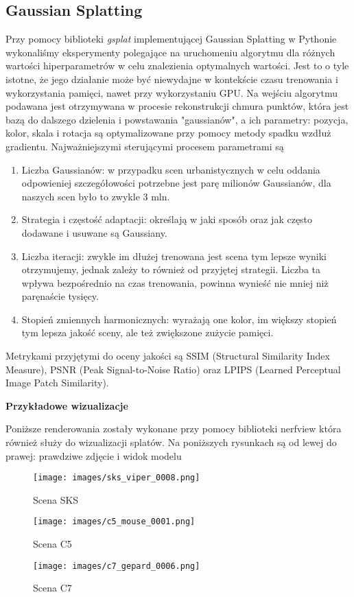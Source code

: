 \subsection{Gaussian Splatting}
Przy pomocy biblioteki \textit{gsplat}\cite{ye2024gsplatopensourcelibrarygaussian} implementującej Gaussian Splatting w Pythonie wykonaliśmy eksperymenty polegające na uruchomeniu algorytmu dla różnych wartości hiperparametrów w celu znalezienia optymalnych wartości. Jest to o tyle istotne, że jego działanie może być niewydajne w kontekście czasu trenowania i wykorzystania pamięci, nawet przy wykorzystaniu GPU. 
Na wejściu algorytmu podawana jest otrzymywana w procesie rekonstrukcji chmura punktów, która jest bazą do dalszego dzielenia i powstawania "gaussianów", a ich parametry: pozycja, kolor, skala i rotacja są optymalizowane przy pomocy metody spadku wzdłuż gradientu.
Najważniejszymi sterującymi procesem parametrami są 
\begin{enumerate}
    \item Liczba Gaussianów: w przypadku scen urbanistycznych w celu oddania odpowieniej szczegółowości potrzebne jest parę milionów Gaussianów, dla naszych scen było to zwykle 3 mln.
    \item Strategia i częstość adaptacji: określają w jaki sposób oraz jak często dodawane i usuwane są Gaussiany.
    \item Liczba iteracji: zwykle im dłużej trenowana jest scena tym lepsze wyniki otrzymujemy, jednak zależy to również od przyjętej strategii. Liczba ta wpływa bezpośrednio na czas trenowania, powinna wynieść nie mniej niż paręnaście tysięcy.
    \item Stopień zmiennych harmonicznych: wyrażają one kolor, im większy stopień tym lepsza jakość sceny, ale też zwiększone zużycie pamięci.  
\end{enumerate}
Metrykami przyjętymi do oceny jakości są SSIM (Structural Similarity Index Measure), PSNR (Peak Signal-to-Noise Ratio) oraz LPIPS (Learned Perceptual Image Patch Similarity). 

\textbf{Przykładowe wizualizacje}

Poniższe renderowania zostały wykonane przy pomocy biblioteki nerfview która również służy do wizualizacji splatów. Na poniższych rysunkach są od lewej do prawej: prawdziwe zdjęcie i widok modelu

\begin{figure}[!h]
    \centering
    \texttt{[image: images/sks\_viper\_0008.png]}
    \caption{Scena SKS}
    \label{fig:sks_gs}
\end{figure}

\begin{figure}[!h]
    \centering
    \texttt{[image: images/c5\_mouse\_0001.png]}
    \caption{Scena C5}
    \label{fig:c5_gs}
\end{figure}

\begin{figure}[!h]
    \centering
    \texttt{[image: images/c7\_gepard\_0006.png]}
    \caption{Scena C7}
    \label{fig:c7_gs}
\end{figure}